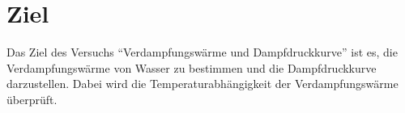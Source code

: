 \section{Ziel}
\label{sec:Ziel}

Das Ziel des Versuchs \enquote{Verdampfungswärme und Dampfdruckkurve} ist es, 
die Verdampfungswärme von Wasser zu bestimmen und die Dampfdruckkurve darzustellen.
Dabei wird die Temperaturabhängigkeit der Verdampfungswärme überprüft.